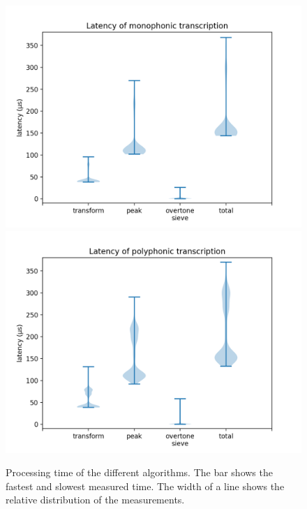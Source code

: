 \documentclass[10pt,twocolumn]{article}
\begin{document}
\begin{figure}[h]%
    \centering
    \includegraphics[width=\linewidth]{1.png}\vspace{+6mm} %
    \includegraphics[width=\linewidth]{2.png} %
    \caption{Processing time of the different algorithms. The bar shows the fastest and slowest measured time. The width of a line shows the relative distribution of the measurements.}
    \label{fig:snel}
\end{figure}%
\end{document}
